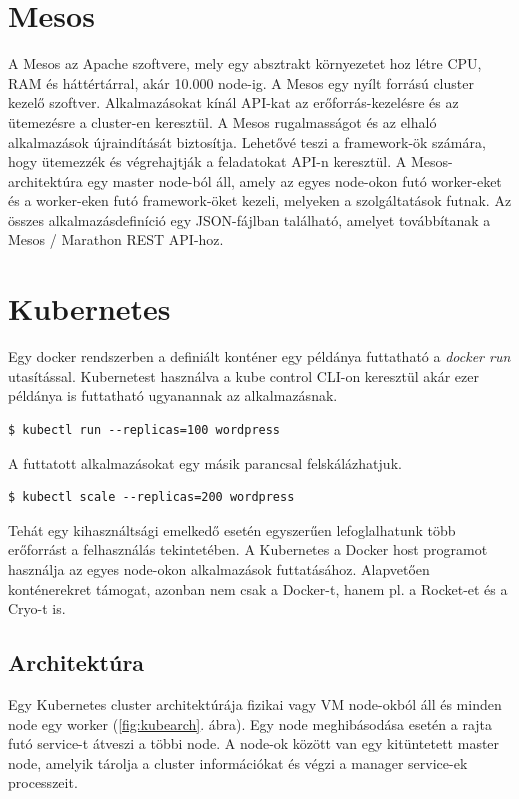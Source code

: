 \section{Mesos}
A Mesos az Apache szoftvere, mely egy absztrakt környezetet hoz létre CPU, RAM és háttértárral, akár 10.000 node-ig. A Mesos egy nyílt forrású cluster kezelő szoftver. Alkalmazásokat kínál API-kat az erőforrás-kezelésre és az ütemezésre a cluster-en keresztül.  A Mesos rugalmasságot és az elhaló alkalmazások újraindítását biztosítja. Lehetővé teszi a framework-ök számára, hogy ütemezzék és végrehajtják a feladatokat API-n keresztül. A Mesos-architektúra egy master node-ból áll, amely az egyes node-okon futó worker-eket és a worker-eken futó framework-öket kezeli, melyeken a szolgáltatások futnak. Az összes alkalmazásdefiníció egy JSON-fájlban található, amelyet továbbítanak a Mesos / Marathon REST API-hoz.

\section{Kubernetes}
Egy docker rendszerben a definiált konténer egy példánya futtatható a \emph{docker run} utasítással. Kubernetest használva a kube control CLI-on keresztül akár ezer példánya is futtatható ugyanannak az alkalmazásnak.
\begin{lstlisting}[caption={Példa 100 alkalmazás indítására}]
$ kubectl run --replicas=100 wordpress
\end{lstlisting}
A futtatott alkalmazásokat egy másik parancsal felskálázhatjuk.
\begin{lstlisting}[caption={Példa alkalmazás skálázására}]
$ kubectl scale --replicas=200 wordpress
\end{lstlisting}
Tehát egy kihasználtsági emelkedő esetén egyszerűen lefoglalhatunk több erőforrást a felhasználás tekintetében.
A Kubernetes a Docker host programot használja az egyes node-okon alkalmazások futtatásához. Alapvetően konténerekret támogat, azonban nem csak a Docker-t, hanem pl. a Rocket-et és a Cryo-t is.
\subsection{Architektúra}
Egy Kubernetes cluster architektúrája fizikai vagy VM node-okból áll és minden node egy worker (\ref{fig:kubearch}. ábra). Egy node meghibásodása esetén a rajta futó service-t átveszi a többi node. A node-ok között van egy kitüntetett master node, amelyik tárolja a cluster információkat és végzi a manager service-ek processzeit.

